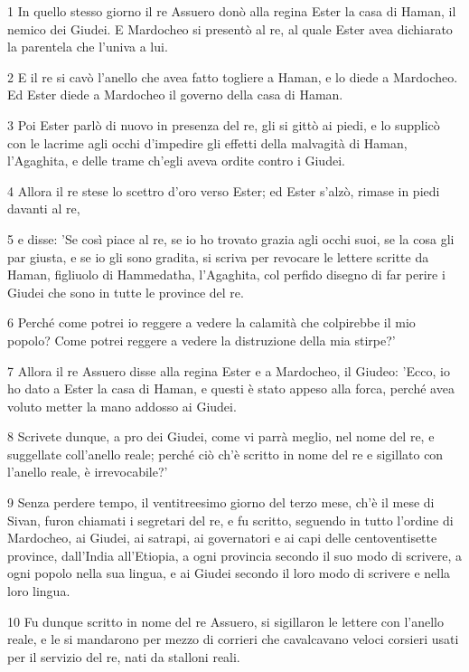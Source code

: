 \par 1 In quello stesso giorno il re Assuero donò alla regina Ester la casa di Haman, il nemico dei Giudei. E Mardocheo si presentò al re, al quale Ester avea dichiarato la parentela che l'univa a lui.
\par 2 E il re si cavò l'anello che avea fatto togliere a Haman, e lo diede a Mardocheo. Ed Ester diede a Mardocheo il governo della casa di Haman.
\par 3 Poi Ester parlò di nuovo in presenza del re, gli si gittò ai piedi, e lo supplicò con le lacrime agli occhi d'impedire gli effetti della malvagità di Haman, l'Agaghita, e delle trame ch'egli aveva ordite contro i Giudei.
\par 4 Allora il re stese lo scettro d'oro verso Ester; ed Ester s'alzò, rimase in piedi davanti al re,
\par 5 e disse: 'Se così piace al re, se io ho trovato grazia agli occhi suoi, se la cosa gli par giusta, e se io gli sono gradita, si scriva per revocare le lettere scritte da Haman, figliuolo di Hammedatha, l'Agaghita, col perfido disegno di far perire i Giudei che sono in tutte le province del re.
\par 6 Perché come potrei io reggere a vedere la calamità che colpirebbe il mio popolo? Come potrei reggere a vedere la distruzione della mia stirpe?'
\par 7 Allora il re Assuero disse alla regina Ester e a Mardocheo, il Giudeo: 'Ecco, io ho dato a Ester la casa di Haman, e questi è stato appeso alla forca, perché avea voluto metter la mano addosso ai Giudei.
\par 8 Scrivete dunque, a pro dei Giudei, come vi parrà meglio, nel nome del re, e suggellate coll'anello reale; perché ciò ch'è scritto in nome del re e sigillato con l'anello reale, è irrevocabile?'
\par 9 Senza perdere tempo, il ventitreesimo giorno del terzo mese, ch'è il mese di Sivan, furon chiamati i segretari del re, e fu scritto, seguendo in tutto l'ordine di Mardocheo, ai Giudei, ai satrapi, ai governatori e ai capi delle centoventisette province, dall'India all'Etiopia, a ogni provincia secondo il suo modo di scrivere, a ogni popolo nella sua lingua, e ai Giudei secondo il loro modo di scrivere e nella loro lingua.
\par 10 Fu dunque scritto in nome del re Assuero, si sigillaron le lettere con l'anello reale, e le si mandarono per mezzo di corrieri che cavalcavano veloci corsieri usati per il servizio del re, nati da stalloni reali.
